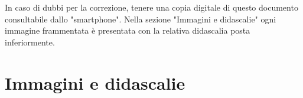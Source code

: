 \documentclass[hidelinks,12pt,a4paper]{article}
\begin{document}
	
	\vspace*{\fill}
	\centering
	\fboxrule=2pt
	\fbox
	{
		\begin{minipage}{\linewidth}
			In caso di dubbi per la correzione, tenere una copia digitale di questo documento consultabile dallo "smartphone". Nella sezione "Immagini e didascalie" ogni immagine frammentata è presentata con la relativa didascalia posta inferiormente.
		\end{minipage}
	}

	\newpage
	\section{Immagini e didascalie}
	
	\begin{adjustwidth}{-30mm}{-30mm}
		
		\begin{minipage}{\linewidth}
			\hfill{
			}
		\end{minipage}
	
	\vspace{4mm}
	
		\begin{minipage}{\linewidth}
\end{minipage}
\end{adjustwidth}
\end{document}
